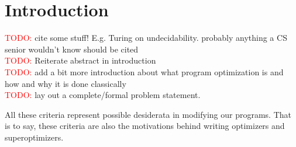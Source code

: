\documentclass[12pt,twoside]{reedthesis}
\newcommand{\red}[1]{\textcolor{red}{#1}}
\begin{document}
\mainmatter %
\pagestyle{fancyplain} %
\chapter*{Introduction} %
    \singlespacing %

\red{TODO:} cite some stuff! E.g. Turing on undecidability. probably anything a CS senior wouldn't know should be cited
\\ \red{TODO:} Reiterate abstract in introduction
\\ \red{TODO:} add a bit more introduction about what program optimization is and how and why it is done classically
\\ \red{TODO:} lay out a complete/formal problem statement. 

All these criteria represent possible desiderata in modifying our programs.
That is to say, these criteria are also the motivations behind writing optimizers and superoptimizers. 
\end{document}
